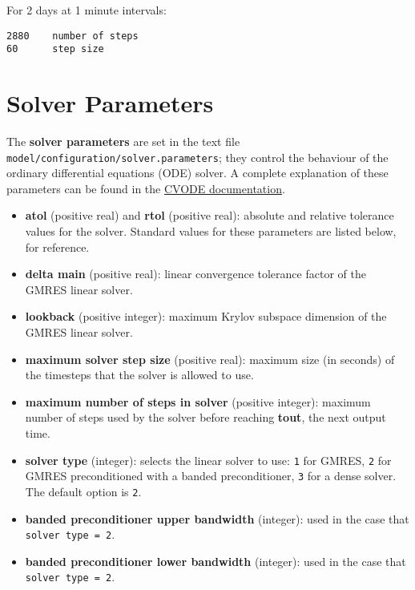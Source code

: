For 2 days at 1 minute intervals:

\begin{verbatim}
2880    number of steps
60      step size
\end{verbatim}

\section{Solver Parameters} \label{sec:solver-parameters}

The \textbf{solver parameters} are set in the text file
\texttt{model/configuration/solver.parameters}; they control the
behaviour of the ordinary differential equations (ODE) solver. A
complete explanation of these parameters can be found in the
\href{https://computation.llnl.gov/projects/sundials/sundials-software}{CVODE
  documentation}.

\begin{itemize}
\item \textbf{atol} (positive real) and \textbf{rtol} (positive real):
  absolute and relative tolerance values for the solver. Standard
  values for these parameters are listed below, for reference.
\item \textbf{delta main} (positive real): linear convergence
  tolerance factor of the GMRES linear solver.
\item \textbf{lookback} (positive integer): maximum Krylov subspace
  dimension of the GMRES linear solver.
\item \textbf{maximum solver step size} (positive real): maximum size
  (in seconds) of the timesteps that the solver is allowed to use.
\item \textbf{maximum number of steps in solver} (positive integer):
  maximum number of steps used by the solver before reaching
  \textbf{tout}, the next output time.
\item \textbf{solver type} (integer): selects the linear solver to
  use: \texttt{1} for GMRES, \texttt{2} for GMRES preconditioned with
  a banded preconditioner, \texttt{3} for a dense solver. The default
  option is \texttt{2}.
\item \textbf{banded preconditioner upper bandwidth} (integer): used
  in the case that \texttt{solver\ type\ =\ 2}.
\item \textbf{banded preconditioner lower bandwidth} (integer): used
  in the case that \texttt{solver\ type\ =\ 2}.
\end{itemize}

